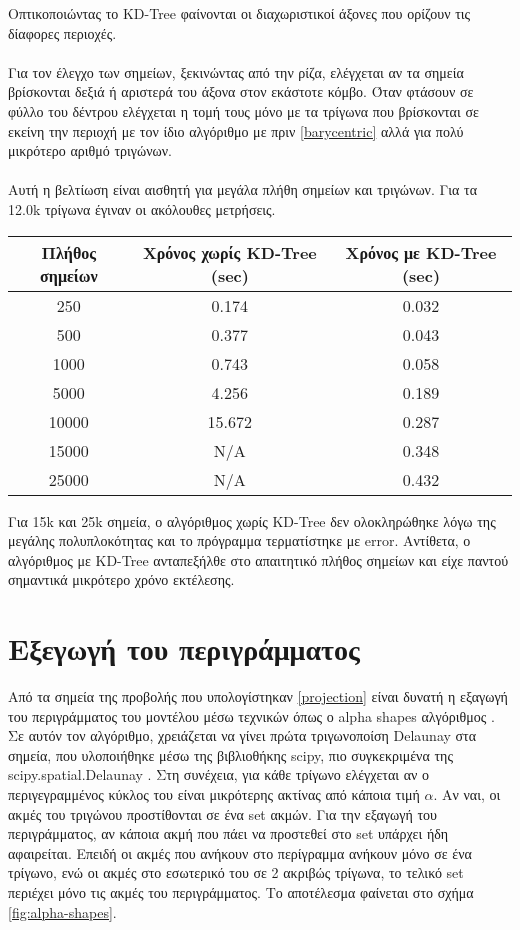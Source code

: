 \documentclass{report}
\begin{document}
Οπτικοποιώντας το KD-Tree φαίνονται οι διαχωριστικοί άξονες που ορίζουν τις δίαφορες περιοχές.
\\\\
Για τον έλεγχο των σημείων, ξεκινώντας από την ρίζα, ελέγχεται αν τα σημεία βρίσκονται δεξιά ή αριστερά του άξονα στον εκάστοτε
κόμβο. Όταν φτάσουν σε φύλλο του δέντρου ελέγχεται η τομή τους μόνο με τα τρίγωνα που βρίσκονται σε εκείνη την περιοχή με τον 
ίδιο αλγόριθμο με πριν \eqref{barycentric} αλλά για πολύ μικρότερο αριθμό τριγώνων.
\\\\
Αυτή η βελτίωση είναι αισθητή για μεγάλα πλήθη σημείων και τριγώνων. Για τα 12.0k τρίγωνα έγιναν οι ακόλουθες μετρήσεις.
\begin{table}[H]
    \centering
    \begin{tabular}{c||c c}
        Πλήθος σημείων & Χρόνος χωρίς KD-Tree (sec) & Χρόνος με KD-Tree (sec) \\
        \hline
        250 & 0.174 & 0.032 \\
        500 & 0.377 & 0.043 \\
        1000 & 0.743 & 0.058 \\
        5000 & 4.256 & 0.189 \\
        10000 & 15.672 & 0.287 \\
        15000 & Ν/Α & 0.348 \\
        25000 & Ν/Α & 0.432 \\
    \end{tabular} 
\end{table}

Για 15k και 25k σημεία, ο αλγόριθμος χωρίς KD-Tree δεν ολοκληρώθηκε λόγω της μεγάλης πολυπλοκότητας και το πρόγραμμα τερματίστηκε με error.
Αντίθετα, ο αλγόριθμος με KD-Tree ανταπεξήλθε στο απαιτητικό πλήθος σημείων και είχε παντού σημαντικά μικρότερο χρόνο εκτέλεσης.


\section{Εξεγωγή του περιγράμματος}
Από τα σημεία της προβολής που υπολογίστηκαν \ref{projection} είναι δυνατή η εξαγωγή του περιγράμματος
του μοντέλου μέσω τεχνικών όπως ο alpha shapes αλγόριθμος \cite{alpha-shapes}. Σε αυτόν τον αλγόριθμο, χρειάζεται να γίνει πρώτα
τριγωνοποίση Delaunay \cite{delanuay-triangulation} στα σημεία, που υλοποιήθηκε μέσω της βιβλιοθήκης scipy, πιο συγκεκριμένα
της scipy.spatial.Delaunay \cite{2020SciPy-NMeth}. Στη συνέχεια, για κάθε τρίγωνο ελέγχεται αν ο περιγεγραμμένος κύκλος του
είναι μικρότερης ακτίνας από κάποια τιμή $\alpha$. Αν ναι, οι ακμές του τριγώνου προστίθονται σε ένα set ακμών. Για την εξαγωγή
του περιγράμματος, αν κάποια ακμή που πάει να προστεθεί στο set υπάρχει ήδη αφαιρείται. Επειδή οι ακμές που ανήκουν στο περίγραμμα
ανήκουν μόνο σε ένα τρίγωνο, ενώ οι ακμές στο εσωτερικό του
σε 2 ακριβώς τρίγωνα, το τελικό set περιέχει μόνο τις ακμές του περιγράμματος. Το αποτέλεσμα φαίνεται στο σχήμα \ref{fig:alpha-shapes}.
\end{document}
